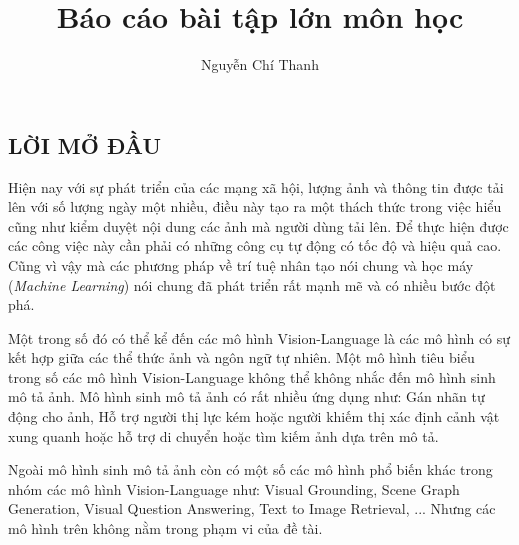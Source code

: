 \documentclass[14pt, a4paper]{article}
\title{Báo cáo bài tập lớn môn học}
\author{Nguyễn Chí Thanh}
\numberwithin{equation}{section}
\numberwithin{algorithm}{section}
\numberwithin{figure}{section}
\numberwithin{table}{section}
\numberwithin{dl}{section}
\numberwithin{md}{section}
\numberwithin{bd}{section}
\numberwithin{dn}{section}
\numberwithin{hq}{section}
\begin{document}
    \cleardoublepage
    \tableofcontents
    \newpage
    \listoffigures
    \newpage
    \listoftables
    \newpage
    \glsaddall 
    \renewcommand*{\glossaryname}{Danh mục từ viết tắt}
    \printnoidxglossary
    \cleardoublepage


    \newpage

    \nocite{*}

    \begin{center}
    \section*{LỜI MỞ ĐẦU}
    \end{center}

    Hiện nay với sự phát triển của các mạng xã hội, lượng ảnh và thông tin được tải lên với số lượng ngày một nhiều, điều này tạo ra một thách thức trong việc hiểu cũng như kiểm duyệt nội dung các ảnh mà người dùng tải lên.
    Để thực hiện được các công việc này cần phải có những công cụ tự động có tốc độ và hiệu quả cao. Cũng vì vậy mà các phương pháp về trí tuệ nhân tạo nói chung và học máy (\textit{Machine Learning}) nói chung đã phát triển rất mạnh mẽ và có nhiều bước đột phá.

    Một trong số đó có thể kể đến các mô hình Vision-Language là các mô hình có sự kết hợp giữa các thể thức ảnh và ngôn ngữ tự nhiên. Một mô hình tiêu biểu trong số các mô hình Vision-Language không thể không nhắc đến mô hình sinh mô tả ảnh.
    Mô hình sinh mô tả ảnh có rất nhiều ứng dụng như: Gán nhãn tự động cho ảnh, Hỗ trợ người thị lực kém hoặc người khiếm thị xác định cảnh vật xung quanh hoặc hỗ trợ di chuyển hoặc tìm kiếm ảnh dựa trên mô tả.

    Ngoài mô hình sinh mô tả ảnh còn có một số các mô hình phổ biến khác trong nhóm các mô hình Vision-Language như: Visual Grounding, Scene Graph Generation, Visual Question Answering, Text to Image Retrieval, ...
    Nhưng các mô hình trên không nằm trong phạm vi của đề tài.
\end{document}

